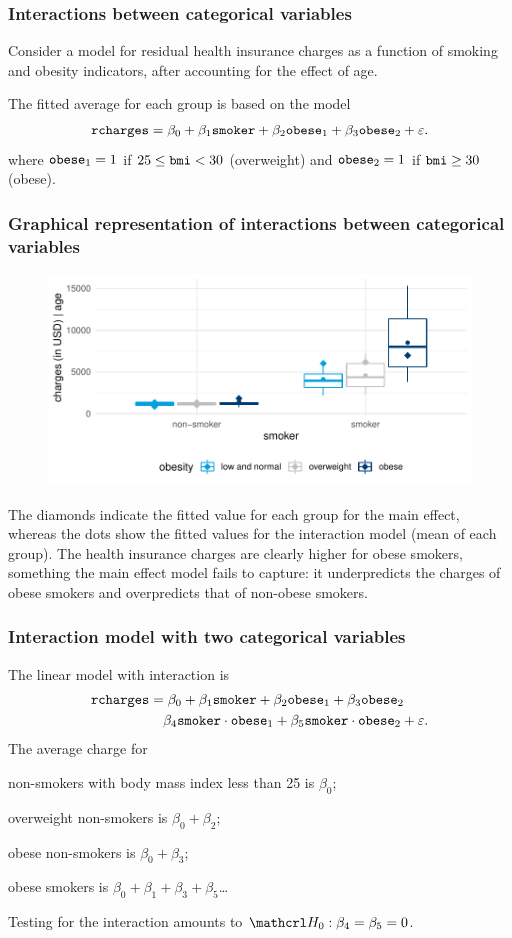 \documentclass{beamer}
\begin{document}
\begin{frame}[fragile]
 \frametitle{Interactions between categorical variables}
  \bi 
 \item Consider a model for residual health insurance charges as a function of smoking and obesity indicators, after accounting for the effect of age.
 \item The fitted average for each group is based on the model
\begin{align*}
\texttt{rcharges} = \beta_0 + \beta_1 \texttt{smoker} + \beta_2 \texttt{obese}_1 +  \beta_3 \texttt{obese}_2 + \varepsilon. 
\end{align*}
where $\texttt{obese}_1=1$ if $25\leq \texttt{bmi} < 30$ (overweight) and $\texttt{obese}_2=1$ if $\texttt{bmi} \geq 30$ (obese).
\ei

\end{frame}
\begin{frame}[fragile]
 \frametitle{Graphical representation of interactions between categorical variables}
\begin{figure}
 \centering
 \includegraphics[width = 0.8\linewidth]{img/c2/03-linreg-interaction_categ.pdf}
\end{figure} 
{\tiny 
The diamonds indicate the fitted value for each group for the main effect, whereas the dots show the fitted values for the interaction model (mean of each group). The health insurance charges are clearly higher for obese smokers, something the main effect model fails to capture: it underpredicts the charges of obese smokers and overpredicts that of non-obese smokers.  \par
}
\end{frame}
\begin{frame}[fragile]
\frametitle{Interaction model with two categorical variables}
The linear model with interaction is
{ \small 
\begin{align*}
\texttt{rcharges} &= \beta_0 + \beta_1 \texttt{smoker} + \beta_2 \texttt{obese}_1 +  \beta_3 \texttt{obese}_2 \\ & \quad \beta_4\texttt{smoker}\cdot\texttt{obese}_1  + \beta_5\texttt{smoker}\cdot\texttt{obese}_2  + \varepsilon. 
\end{align*}
}
The average charge for 
{\small 
\bi 
\item non-smokers with body mass index less than 25 is $\beta_0$;
\item overweight non-smokers is $\beta_0 + \beta_2$;
\item obese non-smokers is $\beta_0 + \beta_3$;
\item obese smokers is $\beta_0 +\beta_1+  \beta_3 + \beta_5$\ldots 
\ei
}
Testing for the interaction amounts to $\Hy_0: \beta_4=\beta_5=0$.
\end{frame}
\end{document}

